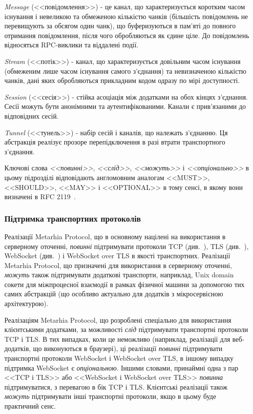 \emph{Message} (<<повідомлення>>) - це канал, що характеризується коротким
часом існування і невеликою та обмеженою кількістю чанків (більшість
повідомлень не перевищують за обсягом один чанк), що буферизуються в пам'яті до
повного отримання повідомлення, після чого обробляються як єдине ціле. До
повідомлень відносяться \gls{RPC}-виклики та віддалені події.

\emph{Stream} (<<потік>>) - канал, що характеризується довільним часом
існування (обмеженим лише часом існування самого з'єднання) та невизначеною
кількістю чанків, дані яких обробляються прикладним кодом одразу по мірі
доступності.

\emph{Session} (<<сесія>>) - стійка асоціація між додатками на обох кінцях
з'єднання. Сесії можуть бути анонімними та аутентифікованими.  Канали є
прив'язаними до відповідних сесій.

\emph{Tunnel} (<<тунель>>) - набір сесій і каналів, що належать з'єднанню.
Ця абстракція реалізує прозоре перепідключення в разі втрати транспортного
з'єднання.

Ключові слова \emph{<<повинні>>}, \emph{<<слід>>}, \emph{<<можуть>>} і
\emph{<<опціонально>>} в цьому підрозділі відповідають англомовним аналогам
<<MUST>>, <<SHOULD>>, <<MAY>> і <<OPTIONAL>> в тому сенсі, в якому вони
визначені в RFC 2119~\cite{rfc2119}.

\subsubsection{Підтримка транспортних протоколів}

Реалізації Metarhia Protocol, що в основному націлені на використання в
серверному оточенні, \emph{повинні} підтримувати протоколи \gls{TCP}
(див.~\cite{rfc793}), \gls{TLS} (див.~\cite{rfc5246}), WebSocket
(див.~\cite{rfc6455}) і WebSocket over \gls{TLS} в якості транспортних.
Реалізації Metarhia Protocol, що призначені для використання в серверному
оточенні, \emph{можуть} також підтримувати додаткові транспорти, наприклад,
Unix domain сокети для міжпроцесної взаємодії в рамках фізичної машини за
допомогою тих самих абстракцій (що особливо актуально для додатків з
мікросервісною архітектурою).

Реалізаціям Metarhia Protocol, що розроблені спеціально для використання
клієнтськими додатками, за можливості \emph{слід} підтримувати транспортні
протоколи \gls{TCP} і \gls{TLS}.  В тих випадках, коли це неможливо (наприклад,
реалізації для веб-додатків, що виконуються в браузері), ці реалізації
\emph{повинні} підтримувати транспортні протоколи WebSocket і WebSocket over
\gls{TLS}, в іншому випадку підтримка WebSocket є \emph{опціональною}.  Іншими
словами, принаймні одна з пар <<\gls{TCP} і \gls{TLS}>> або <<WebSocket і
WebSocket over \gls{TLS}>> \emph{повинна} підтримуватися, з перевагою в бік
\gls{TCP} і \gls{TLS}.  Клієнтські реалізації також \emph{можуть} підтримувати
інші транспортні протоколи, якщо в цьому буде практичний сенс.


